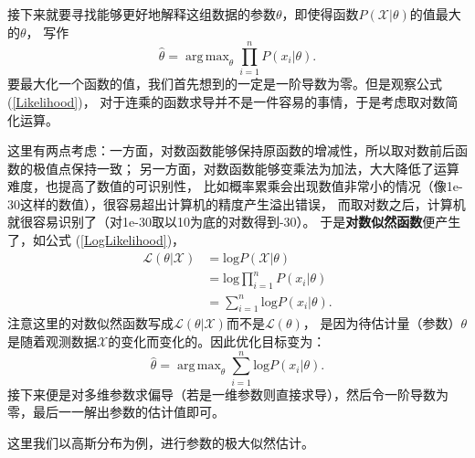 \documentclass[UTF8]{ctexart}
\DeclareMathOperator*{\argmax}{arg\,max}
\begin{document}
接下来就要寻找能够更好地解释这组数据的参数$\theta$，即使得函数$P(\mathcal{X}|\theta)$的值最大的$\theta$，
写作
\begin{equation}\label{}
  \hat\theta = \argmax_{\theta} \prod_{i=1}^{n}P(x_i|\theta).
\end{equation}
要最大化一个函数的值，我们首先想到的一定是一阶导数为零。但是观察公式 (\ref{Likelihood})，
对于连乘的函数求导并不是一件容易的事情，于是考虑取对数简化运算。

这里有两点考虑：一方面，对数函数能够保持原函数的增减性，所以取对数前后函数的极值点保持一致；
另一方面，对数函数能够变乘法为加法，大大降低了运算难度，也提高了数值的可识别性，
比如概率累乘会出现数值非常小的情况（像1e-30这样的数值），很容易超出计算机的精度产生溢出错误，
而取对数之后，计算机就很容易识别了（对1e-30取以10为底的对数得到-30）。
于是\textbf{对数似然函数}便产生了，如公式 (\ref{LogLikelihood})，
\begin{equation}\label{LogLikelihood}
  \begin{split}
    \mathcal{L}(\theta|\mathcal{X}) &= \mathrm{log}P(\mathcal{X}|\theta)\\
    &= \mathrm{log}\prod_{i=1}^{n}P(x_i|\theta)\\
    &= \sum_{i=1}^{n}\mathrm{log}P(x_i|\theta).
  \end{split}
\end{equation}
注意这里的对数似然函数写成$\mathcal{L}(\theta|\mathcal{X})$而不是$\mathcal{L}(\theta)$，
是因为待估计量（参数）$\theta$是随着观测数据$\mathcal{X}$的变化而变化的。因此优化目标变为：
\begin{equation}\label{}
  \hat\theta = \argmax_{\theta} \sum_{i=1}^{n}\mathrm{log}P(x_i|\theta).
\end{equation}
接下来便是对多维参数求偏导（若是一维参数则直接求导），然后令一阶导数为零，最后一一解出参数的估计值即可。

这里我们以高斯分布为例，进行参数的极大似然估计。
\end{document}
